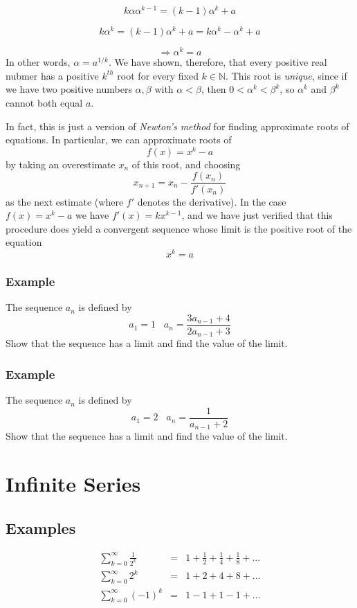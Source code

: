 \documentclass[12pt]{scrbook}
\begin{document}
\[ k \alpha \alpha^{k-1} = (k-1)\alpha^k + a \]

\[ k\alpha^k = (k-1)\alpha^k + a = k\alpha^k - \alpha^k + a \]

\[ \Rightarrow \alpha^k = a \]
In other words, $\alpha = a^{1/k}$.    We have shown, therefore, that every positive real nubmer has a positive
$k^{th}$ root for every fixed $k \in \mathbb{N}$.  This root is {\em unique}, since if we have two positive numbers
$\alpha, \beta$ with $\alpha < \beta$, then $0 < \alpha^k < \beta^k$, so $\alpha^k$ and $\beta^k$ cannot both equal $a$.

In fact, this is just a version of {\em Newton's method} for finding approximate roots of equations.  In particular, we can
approximate roots of 
\[ f(x) = x^k - a \]
by taking an overestimate $x_n$ of this root, and choosing
\[ x_{n+1} = x_n - \frac{f(x_n)}{f'(x_n)} \]
as the next estimate (where $f'$ denotes the derivative).  In the case $f(x) = x^k - a$ we have $f'(x) = kx^{k-1}$, and we 
have just verified that this procedure does yield a convergent sequence whose limit is the positive root of the equation
\[ x^k = a \]

\subsection{Example}
The sequence $a_n$ is defined by 
\[ a_1 = 1 \;\;\; a_n = \frac{3a_{n-1} + 4}{2a_{n-1} + 3} \]
Show that the sequence has a limit and find the value of the limit.

\subsection{Example}
The sequence $a_n$ is defined by 
\[ a_1 = 2 \;\;\; a_n = \frac{1}{a_{n-1} + 2} \]
Show that the sequence has a limit and find the value of the limit.


\chapter{Infinite Series}

\section{Examples}

\begin{eqnarray*}
\sum_{k=0}^{\infty} \frac{1}{2^k} 	&=& 1 + \frac{1}{2} + \frac{1}{4} + \frac{1}{8} + \ldots  \\
\sum_{k=0}^{\infty} 2^k			&=& 1 + 2 + 4 + 8 + \ldots  \\
\sum_{k=0}^{\infty} (-1)^k 			&=& 1 - 1 + 1 - 1 + \ldots 
\end{eqnarray*}
\end{document}
